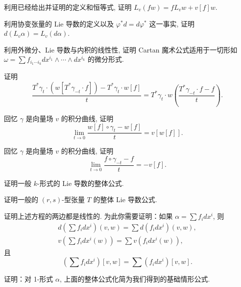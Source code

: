 \begin{question}\label{q:A-14}
利用已经给出并证明的定义和恒等式, 证明 $L_v(fw)=fL_vw+v[f]w$.
\end{question}

\begin{question}\label{q:A-15}
利用协变张量的 Lie 导数的定义以及 $\varphi^*d=d\varphi^*$ 这一事实, 证明 $d\left(L_v\alpha\right)=L_v\left(d\alpha\right)$.
\end{question}

\begin{question}\label{q:A-16}
利用外微分、Lie 导数与内积的线性性, 证明 Cartan 魔术公式适用于一切形如 $\omega=\sum f_{i_1\cdots i_k}dx^{i_1}\wedge\cdots\wedge dx^{i_k}$ 的微分形式.
\end{question}

\begin{question}\label{q:A-17}
证明
\[
\frac{T^*\gamma_t\cdot\left(w\left[T^*\gamma_{-t}\cdot f\right]\right)-T^*\gamma_t\cdot w[f]}{t}
=T^*\gamma_t\cdot w\left(\frac{T^*\gamma_{-t}\cdot f-f}{t}\right).
\]
\end{question}

\begin{question}\label{q:A-18}
回忆 $\gamma$ 是向量场 $v$ 的积分曲线, 证明
\[
\lim_{t\to0}\frac{w[f]\circ\gamma_t-w[f]}{t}=v\left[w[f]\right].
\]
\end{question}

\begin{question}\label{q:A-19}
回忆 $\gamma$ 是向量场 $v$ 的积分曲线, 证明
\[
\lim_{t\to0}\frac{f\circ\gamma_{-t}-f}{t}=-v[f].
\]
\end{question}

\begin{question}\label{q:A-20}
证明一般 $k$-形式的 Lie 导数的整体公式.
\end{question}

\begin{question}\label{q:A-21}
证明一般的 $(r,s)$-型张量 $T$ 的整体 Lie 导数公式.
\end{question}

\begin{question}\label{q:A-22}
证明上述方程的两边都是线性的. 为此你需要证明：如果 $\alpha=\sum f_idx^i$, 则
\begin{align*}
d\left(\sum f_idx^i\right)(v,w)=\sum d\left(f_idx^i\right)(v,w), \\
v\left(\sum f_idx^i(w)\right)=\sum v\left(f_idx^i(w)\right),
\end{align*}
且
\[
\left(\sum f_idx^i\right)[v,w]=\sum\left(f_idx^i\right)[v,w].
\]
\end{question}

\begin{question}\label{q:A-23}
证明：对 1-形式 $\alpha$, 上面的整体公式化简为我们得到的基础情形公式.
\end{question}

